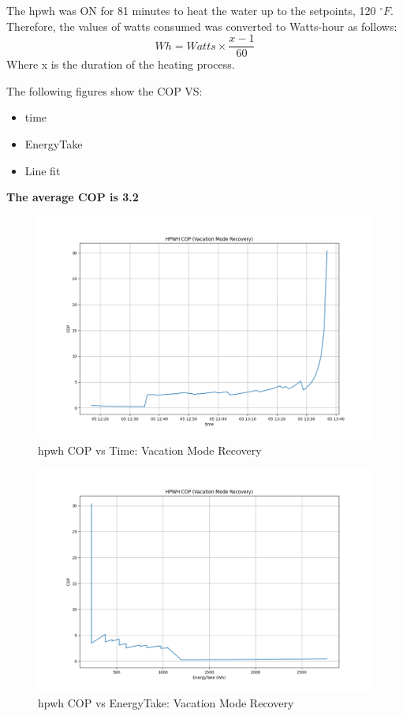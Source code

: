 The \gls{hpwh} was ON for 81 minutes to heat the water up to the setpoints, 120 $^{\circ}F$. Therefore, the values of watts consumed was converted to Watts-hour as follows:
\begin{equation}
    Wh = Watts \times \frac{x-1}{60}
\end{equation}
Where x is the duration of the heating process.

The following figures show the COP VS:
\begin{itemize}
    \item time
    \item EnergyTake
    \item Line fit
\end{itemize}
\textbf{The average COP is 3.2}

\begin{figure}[htp!]
    \centering
    \includegraphics[width=0.9\columnwidth]{Pictures/cop_vs_time.png}
    \caption{\gls{hpwh} COP vs Time: Vacation Mode Recovery}
    \label{fig:copvstime}
\end{figure}

\begin{figure}[htp!]
    \centering
    \includegraphics[width=0.9\columnwidth]{Pictures/cop_vs_EnergyTake.png}
    \caption{\gls{hpwh} COP vs EnergyTake: Vacation Mode Recovery}
    \label{fig:copvsenergytake}
\end{figure}
\newpage


